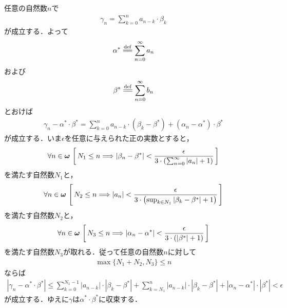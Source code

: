 	\begin{sketch}
		任意の自然数$n$で
		\begin{align}
			\gamma_n = \sum_{k=0}^n a_{n-k} \cdot \beta_k
		\end{align}
		が成立する．よって
		\begin{align}
			\alpha^* \defeq \sum_{n=0}^\infty a_n
		\end{align}
		および
		\begin{align}
			\beta^* \defeq \sum_{n=0}^\infty b_n
		\end{align}
		とおけば
		\begin{align}
			\gamma_n - \alpha^* \cdot \beta^*
			= \sum_{k=0}^n a_{n-k} \cdot (\beta_k - \beta^*)
			+ (\alpha_n - \alpha^*) \cdot \beta^*
		\end{align}
		が成立する．いま$\epsilon$を任意に与えられた正の実数とすると，
		\begin{align}
			\forall n \in {\boldsymbol \omega}\, 
			\left[\, N_1 \leq n \Longrightarrow |\beta_n - \beta^*| < \frac{\epsilon}{3 \cdot \left(\sum_{n=0}^\infty |a_n| + 1\right)}\, \right]
		\end{align}
		を満たす自然数$N_1$と，
		\begin{align}
			\forall n \in {\boldsymbol \omega}\, 
			\left[\, N_2 \leq n \Longrightarrow |a_n| < \frac{\epsilon}{3 \cdot \left(\operatorname*{sup}_{k \in N_1} |\beta_k - \beta^*| + 1\right)}\, \right]
		\end{align}
		を満たす自然数$N_2$と，
		\begin{align}
			\forall n \in {\boldsymbol \omega}\, 
			\left[\, N_3 \leq n \Longrightarrow |\alpha_n - \alpha^*| < \frac{\epsilon}{3 \cdot \left(|\beta^*| + 1\right)}\, \right]
		\end{align}
		を満たす自然数$N_3$が取れる．従って任意の自然数$n$に対して
		\begin{align}
			\max{\{N_1 + N_2, N_3\}} \leq n
		\end{align}
		ならば
		\begin{align}
			|\gamma_n - \alpha^* \cdot \beta^*|
			\leq \sum_{k=0}^{N_1-1} |a_{n-k}| \cdot |\beta_k - \beta^*|
			+ \sum_{k=N_1}^{n} |a_{n-k}| \cdot |\beta_k - \beta^*|
			+ |\alpha_n - \alpha^*| \cdot |\beta^*|
			< \epsilon
		\end{align}
		が成立する．ゆえに$\gamma$は$\alpha^* \cdot \beta^*$に収束する．
		\QED
	\end{sketch}
	